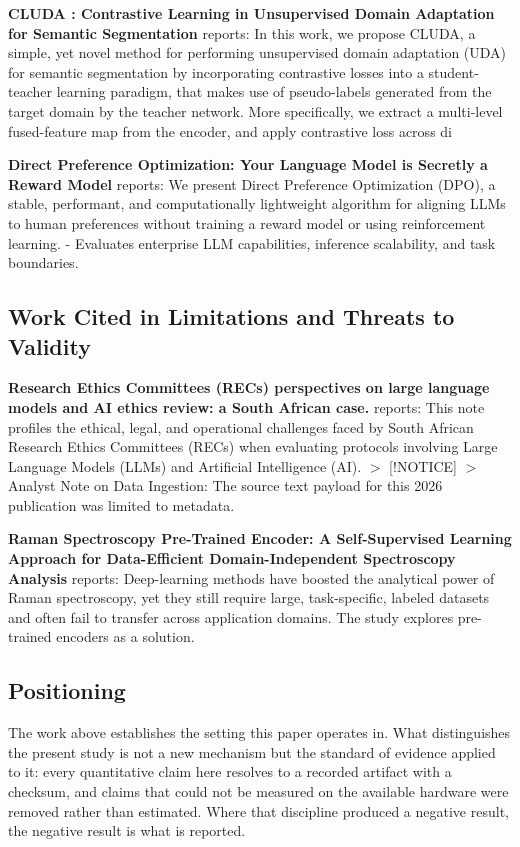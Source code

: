 \documentclass[10pt,journal,compsoc,twocolumn]{IEEEtran}
\begin{document}
\textbf{CLUDA : Contrastive Learning in Unsupervised Domain Adaptation for Semantic Segmentation} \cite{arxiv_2208_14227} reports: In this work, we propose CLUDA, a simple, yet novel method for performing unsupervised domain adaptation (UDA) for semantic segmentation by incorporating contrastive losses into a student-teacher learning paradigm, that makes use of pseudo-labels generated from the target domain by the teacher network. More specifically, we extract a multi-level fused-feature map from the encoder, and apply contrastive loss across di

\textbf{Direct Preference Optimization: Your Language Model is Secretly a Reward Model} \cite{arxiv_2305_18290} reports: We present Direct Preference Optimization (DPO), a stable, performant, and computationally lightweight algorithm for aligning LLMs to human preferences without training a reward model or using reinforcement learning. - Evaluates enterprise LLM capabilities, inference scalability, and task boundaries.


\subsection{Work Cited in Limitations and Threats to Validity}


\textbf{Research Ethics Committees (RECs) perspectives on large language models and AI ethics review: a South African case.} \cite{pubmed_42380865} reports: This note profiles the ethical, legal, and operational challenges faced by South African Research Ethics Committees (RECs) when evaluating protocols involving Large Language Models (LLMs) and Artificial Intelligence (AI). $>$ [!NOTICE] $>$ Analyst Note on Data Ingestion: The source text payload for this 2026 publication was limited to metadata.

\textbf{Raman Spectroscopy Pre-Trained Encoder: A Self-Supervised Learning Approach for Data-Efficient Domain-Independent Spectroscopy Analysis} \cite{doaj_001772c2113c476d9d5d40452c8e10e1} reports: Deep-learning methods have boosted the analytical power of Raman spectroscopy, yet they still require large, task-specific, labeled datasets and often fail to transfer across application domains. The study explores pre-trained encoders as a solution.


\subsection{Positioning}


The work above establishes the setting this paper operates in. What distinguishes the present study is not a new mechanism but the standard of evidence applied to it: every quantitative claim here resolves to a recorded artifact with a checksum, and claims that could not be measured on the available hardware were removed rather than estimated. Where that discipline produced a negative result, the negative result is what is reported.
\end{document}
